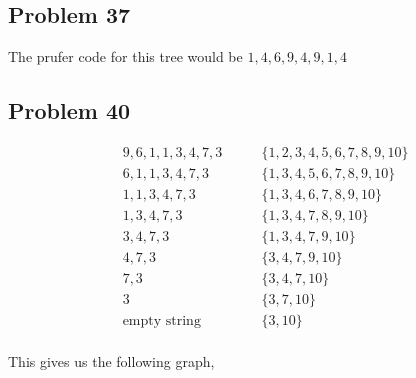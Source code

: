 \documentclass[a4paper]{report}
\begin{document}
\subsection*{Problem 37}
The prufer code for this tree would be $1,4,6,9,4,9,1,4$

\subsection*{Problem 40}
\begin{align*}
    &9,6,1,1,3,4,7,3 \qquad &\{1,2,3,4,5,6,7,8,9,10\} \\
    &6,1,1,3,4,7,3 \qquad &\{1,3,4,5,6,7,8,9,10\} \\
    &1,1,3,4,7,3 \qquad &\{1,3,4,6,7,8,9,10\} \\
    &1,3,4,7,3 \qquad &\{1,3,4,7,8,9,10\} \\
    &3,4,7,3 \qquad &\{1,3,4,7,9,10\} \\
    &4,7,3 \qquad &\{3,4,7,9,10\} \\
    &7,3 \qquad &\{3,4,7,10\} \\
    &3 \qquad &\{3,7,10\} \\
    &\text{empty string} \qquad &\{3,10\} \\
\end{align*}

This gives us the following graph,
\end{document}
